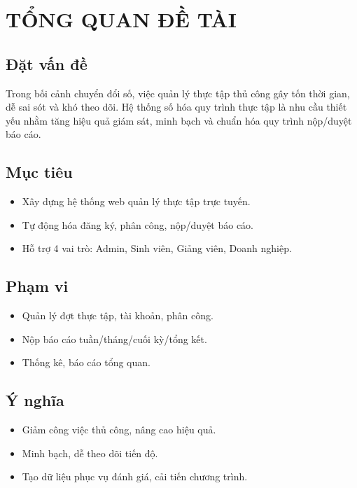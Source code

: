 \chapter{TỔNG QUAN ĐỀ TÀI}

\section{Đặt vấn đề}
Trong bối cảnh chuyển đổi số, việc quản lý thực tập thủ công gây tốn thời gian, dễ sai sót và khó theo dõi. Hệ thống số hóa quy trình thực tập là nhu cầu thiết yếu nhằm tăng hiệu quả giám sát, minh bạch và chuẩn hóa quy trình nộp/duyệt báo cáo.

\section{Mục tiêu}
\begin{itemize}
  \item Xây dựng hệ thống web quản lý thực tập trực tuyến.
  \item Tự động hóa đăng ký, phân công, nộp/duyệt báo cáo.
  \item Hỗ trợ 4 vai trò: Admin, Sinh viên, Giảng viên, Doanh nghiệp.
\end{itemize}

\section{Phạm vi}
\begin{itemize}
  \item Quản lý đợt thực tập, tài khoản, phân công.
  \item Nộp báo cáo tuần/tháng/cuối kỳ/tổng kết.
  \item Thống kê, báo cáo tổng quan.
\end{itemize}

\section{Ý nghĩa}
\begin{itemize}
  \item Giảm công việc thủ công, nâng cao hiệu quả.
  \item Minh bạch, dễ theo dõi tiến độ.
  \item Tạo dữ liệu phục vụ đánh giá, cải tiến chương trình.
\end{itemize}
